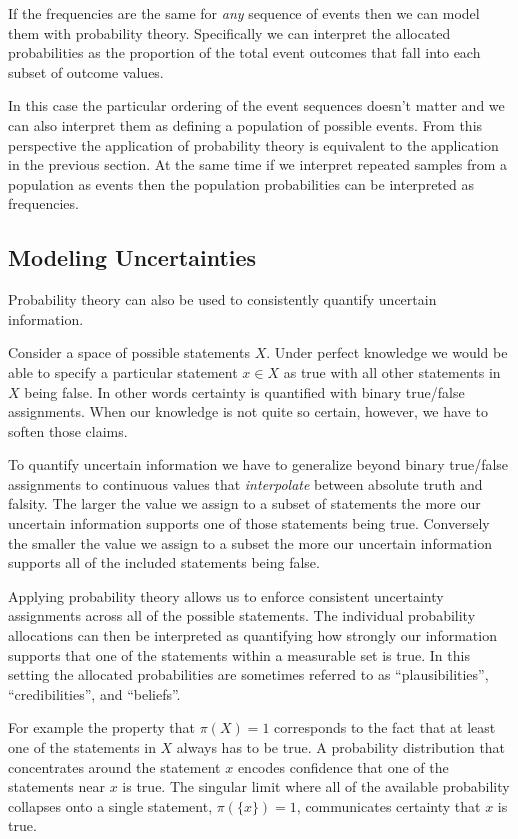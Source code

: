 \documentclass[
  letterpaper,
  DIV=11,
  numbers=noendperiod]{scrartcl}
\begin{document}
If the frequencies are the same for \emph{any} sequence of events then
we can model them with probability theory. Specifically we can interpret
the allocated probabilities as the proportion of the total event
outcomes that fall into each subset of outcome values.

In this case the particular ordering of the event sequences doesn't
matter and we can also interpret them as defining a population of
possible events. From this perspective the application of probability
theory is equivalent to the application in the previous section. At the
same time if we interpret repeated samples from a population as events
then the population probabilities can be interpreted as frequencies.

\hypertarget{modeling-uncertainties}{%
\subsection{Modeling Uncertainties}\label{modeling-uncertainties}}

Probability theory can also be used to consistently quantify uncertain
information.

Consider a space of possible statements \(X\). Under perfect knowledge
we would be able to specify a particular statement \(x \in X\) as true
with all other statements in \(X\) being false. In other words certainty
is quantified with binary true/false assignments. When our knowledge is
not quite so certain, however, we have to soften those claims.

To quantify uncertain information we have to generalize beyond binary
true/false assignments to continuous values that \emph{interpolate}
between absolute truth and falsity. The larger the value we assign to a
subset of statements the more our uncertain information supports one of
those statements being true. Conversely the smaller the value we assign
to a subset the more our uncertain information supports all of the
included statements being false.

Applying probability theory allows us to enforce consistent uncertainty
assignments across all of the possible statements. The individual
probability allocations can then be interpreted as quantifying how
strongly our information supports that one of the statements within a
measurable set is true. In this setting the allocated probabilities are
sometimes referred to as ``plausibilities'', ``credibilities'', and
``beliefs''.

For example the property that \(\pi(X) = 1\) corresponds to the fact
that at least one of the statements in \(X\) always has to be true. A
probability distribution that concentrates around the statement \(x\)
encodes confidence that one of the statements near \(x\) is true. The
singular limit where all of the available probability collapses onto a
single statement, \(\pi( \{ x \} ) = 1\), communicates certainty that
\(x\) is true.
\end{document}
